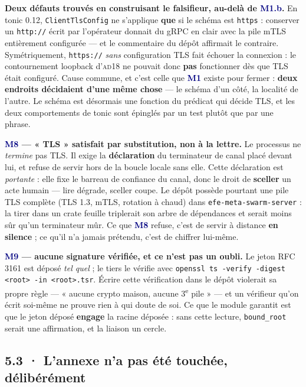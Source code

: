 \documentclass[10pt]{article}
\newcommand{\code}[1]{\texttt{\small #1}}
\newcommand{\mm}[1]{\textbf{\textcolor{navy}{#1}}}
\begin{document}
\begin{alerte}
\textbf{Deux défauts trouvés en construisant le falsifieur, au-delà de \mm{M1.b}.} En tonic 0.12,
\code{ClientTlsConfig} ne s'applique \textbf{que} si le schéma est \code{https} : conserver un
\code{http://} écrit par l'opérateur donnait du gRPC en clair avec la pile mTLS entièrement
configurée --- et le commentaire du dépôt affirmait le contraire. Symétriquement, \code{https://}
\emph{sans} configuration TLS fait échouer la connexion : le contournement loopback d'\textsc{ad18}
ne pouvait donc \textbf{pas} fonctionner dès que TLS était configuré. Cause commune, et c'est celle
que \mm{M1} existe pour fermer : \textbf{deux endroits décidaient d'une même chose} --- le schéma
d'un côté, la localité de l'autre. Le schéma est désormais une fonction du prédicat qui décide TLS,
et les deux comportements de tonic sont épinglés par un test plutôt que par une phrase.
\end{alerte}

\textbf{\mm{M8} --- « TLS » satisfait par substitution, non à la lettre.} Le processus ne
\emph{termine} pas TLS. Il exige la \textbf{déclaration} du terminateur de canal placé devant lui,
et refuse de servir hors de la boucle locale sans elle. Cette déclaration est \emph{portante} : elle
fixe le barreau de confiance du canal, donc le droit de \textbf{sceller} un acte humain --- lire
dégrade, sceller coupe. Le dépôt possède pourtant une pile TLS complète (TLS 1.3, mTLS, rotation à
chaud) dans \code{efe-meta-swarm-server} : la tirer dans un crate feuille triplerait son arbre de
dépendances et serait moins sûr qu'un terminateur mûr. Ce que \mm{M8} refuse, c'est de servir à
distance \textbf{en silence} ; ce qu'il n'a jamais prétendu, c'est de chiffrer lui-même.

\textbf{\mm{M9} --- aucune signature vérifiée, et ce n'est pas un oubli.} Le jeton RFC 3161 est
déposé \emph{tel quel} ; le tiers le vérifie avec
\code{openssl ts -verify -digest <root> -in <root>.tsr}. Écrire cette vérification dans le dépôt
violerait sa propre règle --- « aucune crypto maison, aucune 3\textsuperscript{e} pile » --- et un
vérifieur qu'on écrit soi-même ne prouve rien à qui doute de soi. Ce que le module garantit est que
le jeton déposé \textbf{engage} la racine déposée : sans cette lecture, \code{bound\_root} serait
une affirmation, et la liaison un cercle.

\subsection{5.3 · L'annexe n'a pas été touchée, délibérément}
\end{document}
